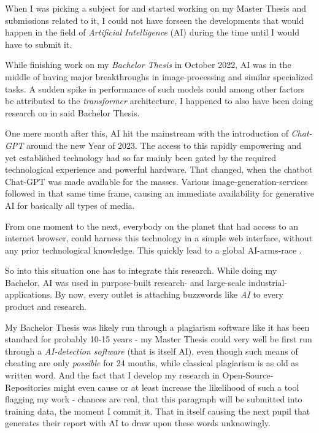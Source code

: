 When I was picking a subject for and started working on my Master Thesis and submissions related to it, I could not have forseen the developments that would happen in the field of \emph{Artificial Intelligence} (AI) during the time until I would have to submit it.

While finishing work on my \emph{Bachelor Thesis} \cite{selfBachelorThesis} in October 2022, AI was in the middle of having major breakthroughs in image-processing and similar specialized tasks. 
A sudden spike in performance of such models could among other factors be attributed to the \emph{transformer} architecture, I happened to also have been doing research on in said Bachelor Thesis.

One mere month after this, AI hit the mainstream with the introduction of \emph{Chat-GPT} \cite{chatGPT} around the new Year of 2023.
The access to this rapidly empowering and yet established technology had so far mainly been gated by the required technological experience and powerful hardware. 
That changed, when the chatbot Chat-GPT was made available for the masses. 
Various image-generation-services followed in that same time frame, causing an immediate availability for generative AI for basically all types of media.

From one moment to the next, everybody on the planet that had access to an internet browser, could harness this technology in a simple web interface, without any prior technological knowledge. 
This quickly lead to a global AI-arms-race \cite{aiBoom}.


So into this situation one has to integrate this research. 
While doing my Bachelor, AI was used in purpose-built research- and large-scale industrial-applications.
By now, every outlet is attaching buzzwords like \emph{AI} to every product and research.

My Bachelor Thesis was likely run through a plagiarism software like it has been standard for probably 10-15 years - my Master Thesis could very well be first run through a \emph{AI-detection software} (that is itself \glqq AI\grqq), even though such means of cheating are only \emph{possible} for 24 months, while classical plagiarism is as old as written word.
And the fact that I develop my research in Open-Source-Repositories might even cause or at least increase the likelihood of such a tool flagging my work - chances are real, that this paragraph will be submitted into training data, the moment I commit it.
That in itself causing the next pupil that generates their report with AI to draw upon these words unknowingly.\\

